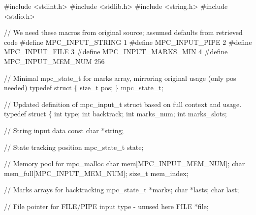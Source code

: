 \documentclass[
  a4paper,
]{scrreprt}
\newenvironment{Shaded}{\begin{snugshade}}{\end{snugshade}}
\newcommand{\CommentTok}[1]{\textcolor[rgb]{0.41,0.41,0.41}{#1}}
\newcommand{\DataTypeTok}[1]{\textcolor[rgb]{0.47,0.16,0.63}{#1}}
\newcommand{\DecValTok}[1]{\textcolor[rgb]{0.47,0.16,0.63}{#1}}
\newcommand{\ImportTok}[1]{\textcolor[rgb]{0.33,0.33,0.33}{#1}}
\newcommand{\KeywordTok}[1]{\textcolor[rgb]{0.85,0.12,0.09}{#1}}
\newcommand{\NormalTok}[1]{\textcolor[rgb]{0.33,0.33,0.33}{#1}}
\newcommand{\OperatorTok}[1]{\textcolor[rgb]{0.00,0.46,0.62}{#1}}
\newcommand{\PreprocessorTok}[1]{\textcolor[rgb]{0.47,0.16,0.63}{#1}}
\theoremstyle{definition}
\theoremstyle{remark}
\begin{document}
\begin{Shaded}
\begin{Highlighting}[numbers=left,,]
\PreprocessorTok{\#include }\ImportTok{\textless{}stdint.h\textgreater{}}
\PreprocessorTok{\#include }\ImportTok{\textless{}stdlib.h\textgreater{}}
\PreprocessorTok{\#include }\ImportTok{\textless{}string.h\textgreater{}}
\PreprocessorTok{\#include }\ImportTok{\textless{}stdio.h\textgreater{}}

\CommentTok{// We need these macros from original source; assumed defaults from retrieved code}
\PreprocessorTok{\#define MPC\_INPUT\_STRING }\DecValTok{1}
\PreprocessorTok{\#define MPC\_INPUT\_PIPE }\DecValTok{2}
\PreprocessorTok{\#define MPC\_INPUT\_FILE }\DecValTok{3}
\PreprocessorTok{\#define MPC\_INPUT\_MARKS\_MIN }\DecValTok{4}
\PreprocessorTok{\#define MPC\_INPUT\_MEM\_NUM }\DecValTok{256}

\CommentTok{// Minimal mpc\_state\_t for marks array, mirroring original usage (only pos needed)}
\KeywordTok{typedef} \KeywordTok{struct} \OperatorTok{\{}
  \DataTypeTok{size\_t}\NormalTok{ pos}\OperatorTok{;}
\OperatorTok{\}}\NormalTok{ mpc\_state\_t}\OperatorTok{;}

\CommentTok{// Updated definition of mpc\_input\_t struct based on full context and usage.}
\KeywordTok{typedef} \KeywordTok{struct} \OperatorTok{\{}
  \DataTypeTok{int}\NormalTok{ type}\OperatorTok{;}
  \DataTypeTok{int}\NormalTok{ backtrack}\OperatorTok{;}
  \DataTypeTok{int}\NormalTok{ marks\_num}\OperatorTok{;}
  \DataTypeTok{int}\NormalTok{ marks\_slots}\OperatorTok{;}

  \CommentTok{// String input data}
  \DataTypeTok{const} \DataTypeTok{char} \OperatorTok{*}\NormalTok{string}\OperatorTok{;}

  \CommentTok{// State tracking position}
\NormalTok{  mpc\_state\_t state}\OperatorTok{;}

  \CommentTok{// Memory pool for mpc\_malloc}
  \DataTypeTok{char}\NormalTok{ mem}\OperatorTok{[}\NormalTok{MPC\_INPUT\_MEM\_NUM}\OperatorTok{];}
  \DataTypeTok{char}\NormalTok{ mem\_full}\OperatorTok{[}\NormalTok{MPC\_INPUT\_MEM\_NUM}\OperatorTok{];}
  \DataTypeTok{size\_t}\NormalTok{ mem\_index}\OperatorTok{;}

  \CommentTok{// Marks arrays for backtracking}
\NormalTok{  mpc\_state\_t }\OperatorTok{*}\NormalTok{marks}\OperatorTok{;}
  \DataTypeTok{char} \OperatorTok{*}\NormalTok{lasts}\OperatorTok{;}
  \DataTypeTok{char}\NormalTok{ last}\OperatorTok{;}

  \CommentTok{// File pointer for FILE/PIPE input type {-} unused here}
  \DataTypeTok{FILE} \OperatorTok{*}\NormalTok{file}\OperatorTok{;}


\end{Highlighting}
\end{Shaded}
\end{document}
